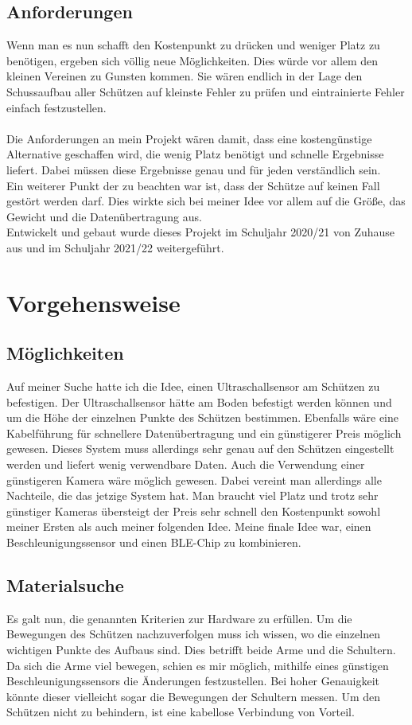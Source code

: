 \subsection{Anforderungen}
Wenn man es nun schafft den Kostenpunkt zu drücken und weniger Platz zu benötigen,
ergeben sich völlig neue Möglichkeiten. Dies würde vor allem den kleinen Vereinen zu Gunsten 
kommen. Sie wären endlich in der Lage den Schussaufbau aller Schützen auf kleinste Fehler 
zu prüfen und eintrainierte Fehler einfach festzustellen.\\
\\
Die Anforderungen an mein Projekt wären damit, dass eine kostengünstige Alternative 
geschaffen wird, die wenig Platz benötigt und schnelle Ergebnisse liefert. Dabei müssen diese 
Ergebnisse genau und für jeden verständlich sein.\\
Ein weiterer Punkt der zu beachten war ist, dass der Schütze auf keinen Fall gestört werden 
darf. Dies wirkte sich bei meiner Idee vor allem auf die Größe, das Gewicht und die 
Datenübertragung aus.\\
Entwickelt und gebaut wurde dieses Projekt im Schuljahr 2020/21 von Zuhause aus und im Schuljahr
2021/22 weitergeführt.

\section{Vorgehensweise}
\subsection{Möglichkeiten}
Auf meiner Suche hatte ich die Idee, einen Ultraschallsensor am Schützen zu befestigen. Der 
Ultraschallsensor hätte am Boden befestigt werden können und um die Höhe der einzelnen 
Punkte des Schützen bestimmen. Ebenfalls wäre eine Kabelführung für schnellere 
Datenübertragung und ein günstigerer Preis möglich gewesen. Dieses System muss allerdings 
sehr genau auf den Schützen eingestellt werden und liefert wenig verwendbare Daten.
Auch die Verwendung einer günstigeren Kamera wäre möglich gewesen. Dabei vereint man 
allerdings alle Nachteile, die das jetzige System hat. Man braucht viel Platz und trotz sehr 
günstiger Kameras übersteigt der Preis sehr schnell den Kostenpunkt sowohl meiner Ersten 
als auch meiner folgenden Idee.
Meine finale Idee war, einen Beschleunigungssensor und einen BLE-Chip zu kombinieren.

\subsection{Materialsuche}
Es galt nun, die genannten Kriterien zur Hardware zu erfüllen. Um die Bewegungen des 
Schützen nachzuverfolgen muss ich wissen, wo die einzelnen wichtigen Punkte des Aufbaus 
sind. Dies betrifft beide Arme und die Schultern. Da sich die Arme viel bewegen, schien es mir 
möglich, mithilfe eines günstigen Beschleunigungssensors die Änderungen festzustellen. Bei 
hoher Genauigkeit könnte dieser vielleicht sogar die Bewegungen der Schultern messen.
Um den Schützen nicht zu behindern, ist eine kabellose Verbindung von Vorteil.

